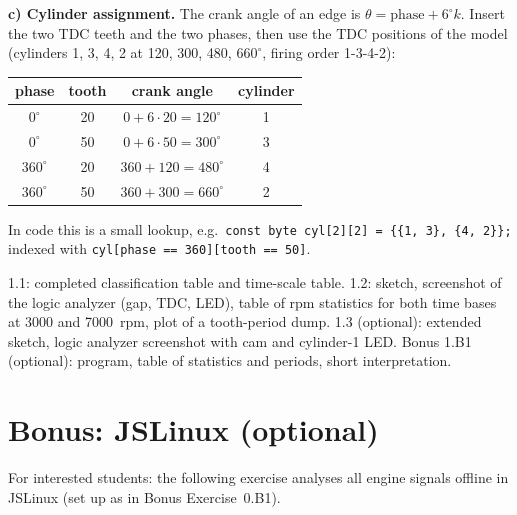 \begin{solution}
\textbf{c) Cylinder assignment.} The crank angle of an edge is
$\theta=\text{phase}+6^\circ k$. Insert the two TDC teeth and the two phases,
then use the TDC positions of the model (cylinders 1, 3, 4, 2 at 120, 300,
480, $660^\circ$, firing order 1-3-4-2):
\begin{center}
\small
\begin{tabular}{@{}cccc@{}}
\toprule
phase & tooth & crank angle & cylinder \\
\midrule
$0^\circ$   & 20 & $0+6\cdot20=120^\circ$ & 1 \\
$0^\circ$   & 50 & $0+6\cdot50=300^\circ$ & 3 \\
$360^\circ$ & 20 & $360+120=480^\circ$ & 4 \\
$360^\circ$ & 50 & $360+300=660^\circ$ & 2 \\
\bottomrule
\end{tabular}
\end{center}
In code this is a small lookup, e.g.\
\lstinline!const byte cyl[2][2] = {{1, 3}, {4, 2}};! indexed with
\lstinline!cyl[phase == 360][tooth == 50]!.
\end{solution}

\begin{deliverables}
1.1: completed classification table and time-scale table. 1.2: sketch,
screenshot of the logic analyzer (gap, TDC, LED), table of rpm statistics for
both time bases at 3000 and \SI{7000}{rpm}, plot of a tooth-period dump. 1.3
(optional): extended sketch, logic analyzer screenshot with cam and
cylinder-1 LED. Bonus 1.B1 (optional): program, table of statistics and
periods, short interpretation.
\end{deliverables}

\section*{Bonus: JSLinux (optional)}
\begingroup
\setcounter{exercise}{0}
For interested students: the following exercise analyses all engine signals
offline in JSLinux (set up as in Bonus Exercise~0.B1).

